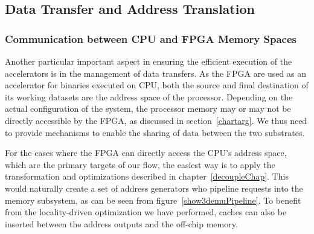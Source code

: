 \subsection{Data Transfer and Address Translation}
\label{dtransfer}
\subsubsection{Communication between CPU and FPGA Memory Spaces}
Another particular important aspect in ensuring the efficient execution of the accelerators is in the management of data transfers. %
As the FPGA are used as an accelerator for binaries executed on CPU, both the source
and final destination of its working datasets are the address space of
the processor. Depending on the actual configuration of the system, the processor memory may or may not be directly accessible by the FPGA, as discussed in section~\ref{chartarg}. We thus need to provide mechanisms to enable
the sharing of data between the two substrates.


For the cases where the FPGA can directly access the 
CPU's address space, which are the primary targets of our flow, the easiest way is to apply the transformation and
optimizations described in chapter~\ref{decoupleChap}. This would
naturally create a set of address generators who pipeline requests into the 
memory subsystem, as can be seen from figure~\ref{show3demuPipeline}. To benefit from the locality-driven optimization we 
have performed, caches can also be inserted between the address outputs and the
off-chip memory. 

